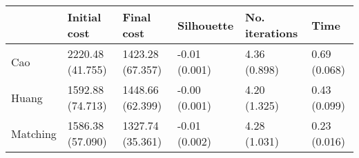 \begin{tabular}{llllll}
\toprule
{} &      Initial cost &        Final cost &     Silhouette & No. iterations &          Time \\
\midrule
Cao      &  2220.48 (41.755) &  1423.28 (67.357) &  -0.01 (0.001) &   4.36 (0.898) &  0.69 (0.068) \\
Huang    &  1592.88 (74.713) &  1448.66 (62.399) &  -0.00 (0.001) &   4.20 (1.325) &  0.43 (0.099) \\
Matching &  1586.38 (57.090) &  1327.74 (35.361) &  -0.01 (0.002) &   4.28 (1.031) &  0.23 (0.016) \\
\bottomrule
\end{tabular}
